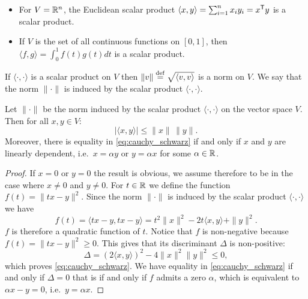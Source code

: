 \documentclass[11pt,nocut]{article}
\begin{document}
\begin{example}
	\leavevmode
	\begin{itemize}
		\item For $V = \mathbb{R}^n$, the Euclidean scalar product $\langle x,y\rangle = \sum_{i=1}^n x_i y_i = x^{{\sf T}} y$ is a scalar product.
		\item If $V$ is the set of all continuous functions on $[0,1]$, then $\langle f,g\rangle = \int_0^1 f(t) g(t) dt$ is a scalar product.
	\end{itemize}
\end{example}

\begin{proposition}
	If $\langle \cdot, \cdot \rangle$ is a scalar product on $V$ then $\| v \| \overset{\rm def}{=} \sqrt{\langle v, v \rangle}$ is a norm on $V$. We say  that the norm $\| \cdot \|$ is induced by the scalar product $\langle \cdot, \cdot \rangle$.
\end{proposition}

\begin{theorem}
	Let $\| \cdot \|$ be the norm induced by the scalar product $\langle \cdot , \cdot \rangle$ on the vector space $V$. Then for all $x,y \in V$:
	\begin{equation}\label{eq:cauchy_schwarz}
	| \langle x,y \rangle | \leq \|x\| \, \|y\|.
	\end{equation}
	Moreover, there is equality in \eqref{eq:cauchy_schwarz} if and only if $x$ and $y$ are linearly dependent, i.e.\ $x = \alpha y$ or $y = \alpha x$ for some $\alpha \in \mathbb{R}$.
\end{theorem}
\begin{proof}
	If $x = 0$ or $y = 0$ the result is obvious, we assume therefore to be in the case where $x \neq 0$ and $y \neq 0$.
	For $t \in \mathbb{R}$ we define the function $f(t) = \|t x - y \|^2$. Since the norm $\| \cdot \|$ is induced by the scalar product $\langle \cdot, \cdot \rangle$ we have
	$$
	f(t) = \langle t x - y , t x - y \rangle = t^2 \|x\|^2 - 2t \langle x,y\rangle + \|y\|^2.
	$$
	$f$ is therefore a quadratic function of $t$. Notice that $f$ is non-negative because $f(t)= \|t x - y \|^2 \geq 0$. This gives that its discriminant $\Delta$ is non-positive:
	$$
	\Delta =  (2 \langle x,y \rangle)^2 - 4 \|x\|^2 \|y\|^2 \leq 0,
	$$
	which proves \eqref{eq:cauchy_schwarz}. We have equality in \eqref{eq:cauchy_schwarz} if and only if $\Delta = 0$ that is if and only if $f$ admits a zero $\alpha$, which is equivalent to $\alpha x - y = 0$, i.e.\ $y = \alpha x$.
\end{proof}
\end{document}
